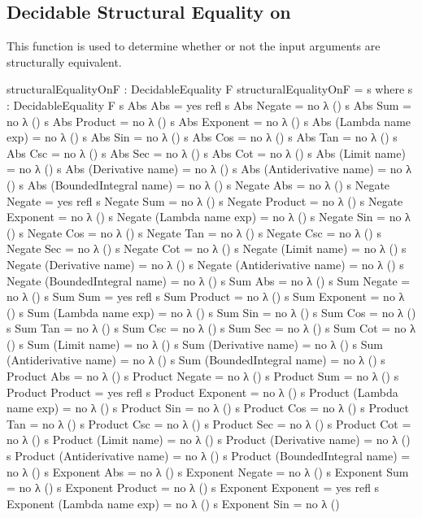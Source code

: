 \documentclass{report}
\begin{document}
\subsection{Decidable Structural Equality on }
This function is used to determine whether or not the input arguments are structurally equivalent.

\begin{code}
structuralEqualityOnF : DecidableEquality F
structuralEqualityOnF = s
  where
  s : DecidableEquality F
  s Abs Abs = yes refl
  s Abs Negate = no λ ()
  s Abs Sum = no λ ()
  s Abs Product = no λ ()
  s Abs Exponent = no λ ()
  s Abs (Lambda name exp) = no λ ()
  s Abs Sin = no λ ()
  s Abs Cos = no λ ()
  s Abs Tan = no λ ()
  s Abs Csc = no λ ()
  s Abs Sec = no λ ()
  s Abs Cot = no λ ()
  s Abs (Limit name) = no λ ()
  s Abs (Derivative name) = no λ ()
  s Abs (Antiderivative name) = no λ ()
  s Abs (BoundedIntegral name) = no λ ()
  s Negate Abs = no λ ()
  s Negate Negate = yes refl
  s Negate Sum = no λ ()
  s Negate Product = no λ ()
  s Negate Exponent = no λ ()
  s Negate (Lambda name exp) = no λ ()
  s Negate Sin = no λ ()
  s Negate Cos = no λ ()
  s Negate Tan = no λ ()
  s Negate Csc = no λ ()
  s Negate Sec = no λ ()
  s Negate Cot = no λ ()
  s Negate (Limit name) = no λ ()
  s Negate (Derivative name) = no λ ()
  s Negate (Antiderivative name) = no λ ()
  s Negate (BoundedIntegral name) = no λ ()
  s Sum Abs = no λ ()
  s Sum Negate = no λ ()
  s Sum Sum = yes refl
  s Sum Product = no λ ()
  s Sum Exponent = no λ ()
  s Sum (Lambda name exp) = no λ ()
  s Sum Sin = no λ ()
  s Sum Cos = no λ ()
  s Sum Tan = no λ ()
  s Sum Csc = no λ ()
  s Sum Sec = no λ ()
  s Sum Cot = no λ ()
  s Sum (Limit name) = no λ ()
  s Sum (Derivative name) = no λ ()
  s Sum (Antiderivative name) = no λ ()
  s Sum (BoundedIntegral name) = no λ ()
  s Product Abs = no λ ()
  s Product Negate = no λ ()
  s Product Sum = no λ ()
  s Product Product = yes refl
  s Product Exponent = no λ ()
  s Product (Lambda name exp) = no λ ()
  s Product Sin = no λ ()
  s Product Cos = no λ ()
  s Product Tan = no λ ()
  s Product Csc = no λ ()
  s Product Sec = no λ ()
  s Product Cot = no λ ()
  s Product (Limit name) = no λ ()
  s Product (Derivative name) = no λ ()
  s Product (Antiderivative name) = no λ ()
  s Product (BoundedIntegral name) = no λ ()
  s Exponent Abs = no λ ()
  s Exponent Negate = no λ ()
  s Exponent Sum = no λ ()
  s Exponent Product = no λ ()
  s Exponent Exponent = yes refl
  s Exponent (Lambda name exp) = no λ ()
  s Exponent Sin = no λ ()

\end{code}
\end{document}
